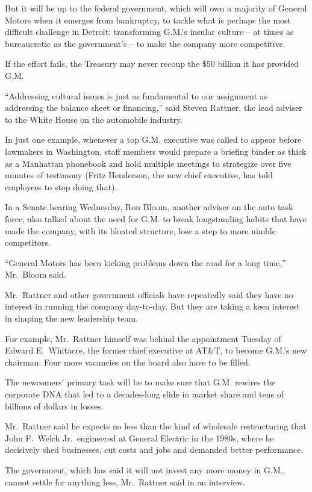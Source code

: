 ﻿\documentclass[12pt,a4paper,onecolumn]{article}
\begin{document}
But it will be up to the federal government, which will own a majority of General Motors when it
emerges from bankruptcy, to tackle what is perhaps the most difficult challenge in Detroit:
transforming G.M.'s insular culture -- at times as bureaucratic as the government's -- to make the
company more competitive.

If the effort fails, the Treasury may never recoup the \$50 billion it has provided G.M.

``Addressing cultural issues is just as fundamental to our assignment as addressing the balance
sheet or financing,'' said Steven Rattner, the lead adviser to the White House on the automobile
industry.

In just one example, whenever a top G.M. executive was called to appear before lawmakers in
Washington, staff members would prepare a briefing binder as thick as a Manhattan phonebook and hold
multiple meetings to strategize over five minutes of testimony (Fritz Henderson, the new chief
executive, has told employees to stop doing that).

In a Senate hearing Wednesday, Ron Bloom, another adviser on the auto task force, also talked about
the need for G.M. to break longstanding habits that have made the company, with its bloated
structure, lose a step to more nimble competitors.

``General Motors has been kicking problems down the road for a long time,'' Mr.~Bloom said.

Mr.~Rattner and other government officials have repeatedly said they have no interest in running the
company day-to-day. But they are taking a keen interest in shaping the new leadership team.

For example, Mr.~Rattner himself was behind the appointment Tuesday of Edward E.~Whitacre, the
former chief executive at AT\&T, to become G.M.'s new chairman. Four more vacancies on the board
also have to be filled.

The newcomers' primary task will be to make sure that G.M. rewires the corporate DNA that led to a
decades-long slide in market share and tens of billions of dollars in losses.

Mr.~Rattner said he expects no less than the kind of wholesale restructuring that John F.~Welch
Jr.~engineered at General Electric in the 1980s, where he decisively shed businesses, cut costs and
jobs and demanded better performance.

The government, which has said it will not invest any more money in G.M., cannot settle for anything
less, Mr.~Rattner said in an interview.
\end{document}
